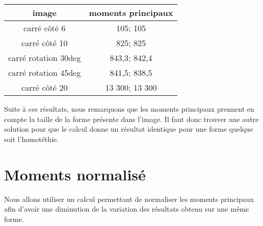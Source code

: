 \documentclass{article}
\begin{document}
  \begin{center}
    \begin{tabular}{|c|c|}
      \hline
      \textbf{image} & \textbf{moments principaux} \\
      \hline
      carré côté 6 & 105; 105 \\
      \hline
      carré côté 10 & 825; 825 \\
      \hline
      carré rotation 30deg & 843,3; 842,4 \\
      \hline
      carré rotation 45deg & 841,5; 838,5 \\
      \hline
      carré côté 20 & 13 300; 13 300 \\
      \hline
    \end{tabular}
  \end{center}
  
  Suite à ces résultats, nous remarquons que les moments principaux prennent en compte 
  la taille de la forme présente dans l'image.
  Il faut donc trouver une autre solution pour que le calcul donne un résultat identique
  pour une forme quelque soit l'homotéthie.
  
  \section{Moments normalisé}
  Nous allons utiliser un calcul permettant de normaliser les moments principaux afin d'avoir
  une diminution de la variation des résultats obtenu sur une même forme.\\
  
\end{document}
